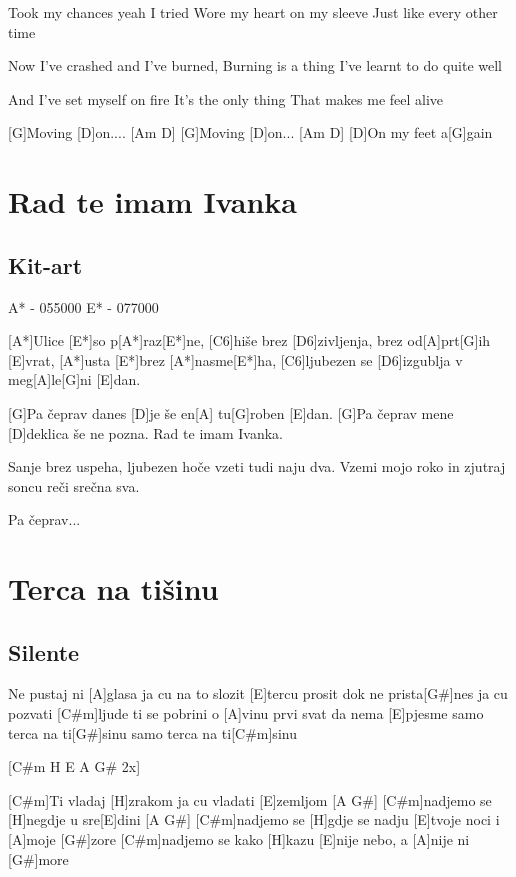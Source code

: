 \documentclass[a4paper,12pt]{article}
\begin{document}
\begin{multicols}{2}
\begin{guitar}
Took my chances yeah I tried
Wore my heart on my sleeve
Just like every other time

Now I've crashed and I've burned,
Burning is a thing
I've learnt to do quite well

And I've set myself on fire
It's the only thing
That makes me feel alive

[G]Moving [D]on.... [Am D]
[G]Moving [D]on...  [Am D]
[D]On my feet a[G]gain
\end{guitar}
\section{Rad te imam Ivanka}
\subsection*{Kit-art}
\begin{guitar}
A* - 055000
E* - 077000


[A*]Ulice [E*]so p[A*]raz[E*]ne,
[C6]hiše brez [D6]zivljenja, brez od[A]prt[G]ih [E]vrat,
[A*]usta [E*]brez [A*]nasme[E*]ha,
[C6]ljubezen se [D6]izgublja v meg[A]le[G]ni [E]dan.



[G]Pa čeprav danes [D]je še en[A] tu[G]roben [E]dan.
[G]Pa čeprav mene [D]deklica še ne pozna.
Rad te imam Ivanka.



Sanje brez uspeha,
ljubezen hoče vzeti tudi naju dva.
Vzemi mojo roko in zjutraj soncu reči
srečna sva.



Pa čeprav...

\end{guitar}
\section{Terca na tišinu}
\subsection*{Silente}
\begin{guitar}
[C#m]Ne pustaj ni [A]glasa
ja cu na to slozit [E]tercu
prosit dok ne prista[G#]nes
ja cu pozvati [C#m]ljude
ti se pobrini o [A]vinu
prvi svat da nema [E]pjesme
samo terca na ti[G#]sinu
samo terca na ti[C#m]sinu



[C#m H E A G# 2x]



[C#m]Ti vladaj [H]zrakom
ja cu vladati [E]zemljom [A  G#]
[C#m]nadjemo se [H]negdje u sre[E]dini [A  G#]
[C#m]nadjemo se [H]gdje se nadju
[E]tvoje noci i [A]moje [G#]zore
[C#m]nadjemo se kako [H]kazu
[E]nije nebo, a [A]nije ni [G#]more




\end{guitar}
\end{multicols}
\end{document}
